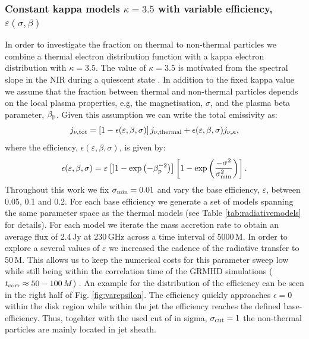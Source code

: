 

\subsubsection{Constant kappa models $\kappa=3.5$ with variable efficiency, $\varepsilon(\sigma,\beta)$}

In order to investigate the fraction on thermal to non-thermal particles we combine a thermal electron distribution function with a kappa electron distribution with $\kappa=3.5$. The value of $\kappa=3.5$ is motivated from the spectral slope in the NIR during a quiescent state . In addition to the fixed kappa value we assume that the fraction between thermal and non-thermal particles depends on the local plasma properties, e.g, the magnetisation, $\sigma$, and the plasma beta parameter, $\beta_{\rm p}$. Given this assumption we can write the total emissivity as:
\begin{equation}
j_{\nu,\rm{tot}}=\left[1-\epsilon(\varepsilon,\beta, \sigma)\right] j_{\nu,\rm{thermal}} + \epsilon(\varepsilon,\beta, \sigma) j_{\nu, \kappa},
\label{eq:kappaeff}
\end{equation}
where the efficiency, $\epsilon(\varepsilon,\beta,\sigma)$, is given by:
\begin{equation}
    \epsilon(\varepsilon,\beta,\sigma)=\varepsilon\left[] 1 - \exp\left(-\beta_{\rm p}^{-2}\right)\right]\left[1-\exp\left(\frac{-\sigma^2}{\sigma_{\rm min}^2}\right)\right].
    \label{eq:efficiencybetasigma}
\end{equation}
Throughout this work we fix $\sigma_{\rm min}=0.01$ and vary the base efficiency, $\varepsilon$, between 0.05, 0.1 and 0.2. For each base efficiency we generate a set of models spanning the same parameter space as the thermal models (see Table \ref{tab:radiativemodels} for details). For each model we iterate the mass accretion rate to obtain an average flux of 2.4\,Jy at 230\,GHz across a time interval of 5000\,M. In order to explore a several values of $\varepsilon$ we increased the cadence of the radiative transfer to 50\,M. This allows us to keep the numerical costs for this parameter sweep low while still being within the correlation time of the GRMHD simulations ($t_{\rm corr}\approx 50-100\,M$) . An example for the distribution of the efficiency can be seen in the right half of  Fig. \ref{fig:varepsilon}. The efficiency quickly approaches $\epsilon=0$ within the disk region while within the jet the efficiency reaches the defined base-efficiency. Thus, togehter with the used cut of in sigma, $\sigma_{\rm cut}=1$ the non-thermal particles are mainly located in jet sheath.

